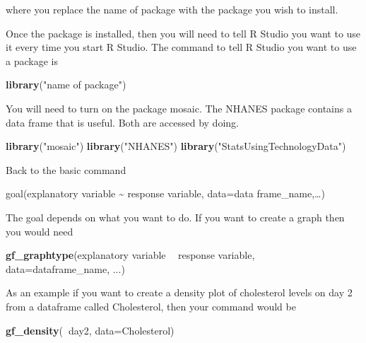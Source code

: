 \documentclass[
]{book}
\newenvironment{Shaded}{\begin{snugshade}}{\end{snugshade}}
\newcommand{\DataTypeTok}[1]{\textcolor[rgb]{0.13,0.29,0.53}{#1}}
\newcommand{\KeywordTok}[1]{\textcolor[rgb]{0.13,0.29,0.53}{\textbf{#1}}}
\newcommand{\NormalTok}[1]{#1}
\newcommand{\OperatorTok}[1]{\textcolor[rgb]{0.81,0.36,0.00}{\textbf{#1}}}
\newcommand{\StringTok}[1]{\textcolor[rgb]{0.31,0.60,0.02}{#1}}
\begin{document}
where you replace the name of package with the package you wish to install.

Once the package is installed, then you will need to tell R Studio you want to use it every time you start R Studio. The command to tell R Studio you want to use a package is

\begin{Shaded}
\begin{Highlighting}[]
\KeywordTok{library}\NormalTok{(}\StringTok{"name of package"}\NormalTok{)}
\end{Highlighting}
\end{Shaded}

You will need to turn on the package mosaic. The NHANES package contains a data frame that is useful. Both are accessed by doing.

\begin{Shaded}
\begin{Highlighting}[]
\KeywordTok{library}\NormalTok{(}\StringTok{"mosaic"}\NormalTok{)}
\KeywordTok{library}\NormalTok{(}\StringTok{"NHANES"}\NormalTok{)}
\KeywordTok{library}\NormalTok{(}\StringTok{"StatsUsingTechnologyData"}\NormalTok{)}
\end{Highlighting}
\end{Shaded}

Back to the basic command

goal(explanatory variable \textasciitilde{} response variable, data=data frame\_name,\ldots)

The goal depends on what you want to do. If you want to create a graph then you would need

\begin{Shaded}
\begin{Highlighting}[]
\KeywordTok{gf_graphtype}\NormalTok{(explanatory variable }\OperatorTok{~}\StringTok{ }
\NormalTok{response variable, }\DataTypeTok{data=}\NormalTok{dataframe_name, ...)}
\end{Highlighting}
\end{Shaded}

As an example if you want to create a density plot of cholesterol levels on day 2 from a dataframe called Cholesterol, then your command would be

\begin{Shaded}
\begin{Highlighting}[]
\KeywordTok{gf_density}\NormalTok{(}\OperatorTok{~}\NormalTok{day2, }\DataTypeTok{data=}\NormalTok{Cholesterol)}
\end{Highlighting}
\end{Shaded}
\end{document}
